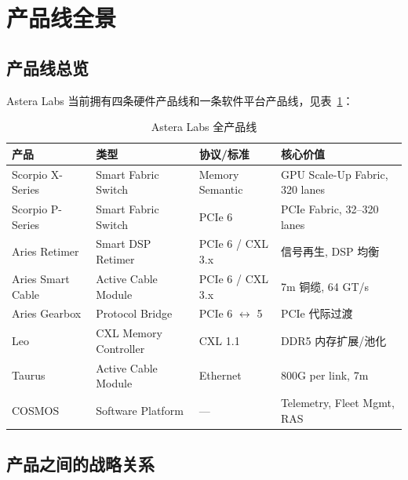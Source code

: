 
\section{产品线全景}

\subsection{产品线总览}

Astera Labs 当前拥有四条硬件产品线和一条软件平台产品线，见表~\ref{tab:products-all}：

\begin{table}[h]
    \centering
    \caption{Astera Labs 全产品线}
    \label{tab:products-all}
    \begin{tabular}{lllp{}}
        \toprule
        \textbf{产品} & \textbf{类型} & \textbf{协议/标准} & \textbf{核心价值} \\
        \midrule
        \rowcolor{blue!8}
        Scorpio X-Series & Smart Fabric Switch & Memory Semantic & GPU Scale-Up Fabric, 320 lanes \\
        \rowcolor{blue!8}
        Scorpio P-Series & Smart Fabric Switch & PCIe 6 & PCIe Fabric, 32–320 lanes \\
        \midrule
        Aries Retimer & Smart DSP Retimer & PCIe 6 / CXL 3.x & 信号再生, DSP 均衡 \\
        Aries Smart Cable & Active Cable Module & PCIe 6 / CXL 3.x & 7m 铜缆, 64 GT/s \\
        Aries Gearbox & Protocol Bridge & PCIe 6 $\leftrightarrow$ 5 & PCIe 代际过渡 \\
        \midrule
        Leo & CXL Memory Controller & CXL 1.1 & DDR5 内存扩展/池化 \\
        \midrule
        Taurus & Active Cable Module & Ethernet & 800G per link, 7m \\
        \midrule
        COSMOS & Software Platform & — & Telemetry, Fleet Mgmt, RAS \\
        \bottomrule
    \end{tabular}
\end{table}


\subsection{产品之间的战略关系}

